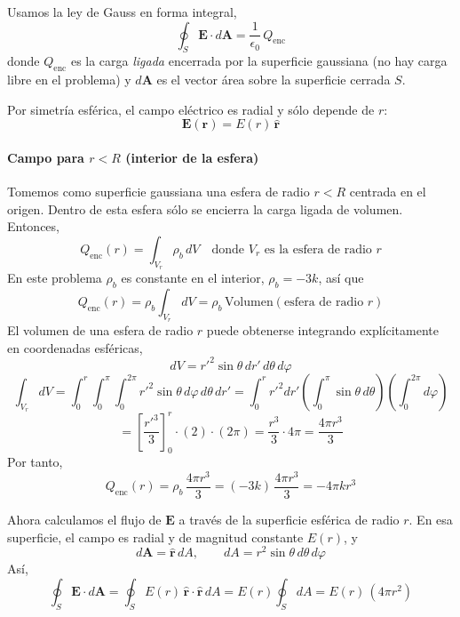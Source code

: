 \documentclass{article}
\begin{document}
Usamos la ley de Gauss en forma integral,
\begin{equation}
\oint_{S} \mathbf{E}\cdot d\mathbf{A} = \frac{1}{\epsilon_{0}}\,Q_{\text{enc}}
\label{eq:gauss}
\end{equation}
donde $Q_{\text{enc}}$ es la carga \emph{ligada} encerrada por la superficie gaussiana
(no hay carga libre en el problema) y $d\mathbf{A}$ es el vector área sobre la superficie cerrada $S$.

Por simetría esférica, el campo eléctrico es radial y sólo depende de $r$:
\begin{equation}
\mathbf{E}(\mathbf{r}) = E(r)\,\hat{\mathbf{r}}
\label{eq:E-radial}
\end{equation}

\paragraph{Campo para $r < R$ (interior de la esfera)}

Tomemos como superficie gaussiana una esfera de radio $r<R$ centrada en el origen.  
Dentro de esta esfera sólo se encierra la carga ligada de volumen. Entonces,
\begin{equation}
Q_{\text{enc}}(r) = \int_{V_{r}} \rho_{b}\, dV
\quad \text{donde } V_{r} \text{ es la esfera de radio } r
\label{eq:Qenc-def}
\end{equation}
En este problema $\rho_{b}$ es constante en el interior, $\rho_{b} = -3k$, así que
\begin{equation}
Q_{\text{enc}}(r) = \rho_{b}\int_{V_{r}} dV
= \rho_{b}\, \text{Volumen}(\text{esfera de radio } r)
\label{eq:Qenc-rho-const}
\end{equation}
El volumen de una esfera de radio $r$ puede obtenerse integrando explícitamente en coordenadas esféricas,
\[
dV = r'^{2}\sin\theta\,dr'\,d\theta\,d\varphi
\]
\[
\int_{V_{r}} dV
= \int_{0}^{r}\int_{0}^{\pi}\int_{0}^{2\pi}
r'^{2}\sin\theta\,d\varphi\,d\theta\,dr'
= \int_{0}^{r} r'^{2}dr'
\left(\int_{0}^{\pi}\sin\theta\,d\theta\right)
\left(\int_{0}^{2\pi}d\varphi\right)
\]
\[
= \left[\frac{r'^{3}}{3}\right]_{0}^{r} \cdot (2) \cdot (2\pi)
= \frac{r^{3}}{3}\cdot 4\pi
= \frac{4\pi r^{3}}{3}
\]
Por tanto,
\begin{equation}
Q_{\text{enc}}(r)
= \rho_{b}\,\frac{4\pi r^{3}}{3}
= (-3k)\,\frac{4\pi r^{3}}{3}
= -4\pi k r^{3}
\label{eq:Qenc-r-menor-R}
\end{equation}

Ahora calculamos el flujo de $\mathbf{E}$ a través de la superficie esférica de radio $r$.  
En esa superficie, el campo es radial y de magnitud constante $E(r)$, y
\[
d\mathbf{A} = \hat{\mathbf{r}}\,dA, 
\qquad dA = r^{2}\sin\theta\,d\theta\,d\varphi
\]
Así,
\begin{equation}
\oint_{S} \mathbf{E}\cdot d\mathbf{A}
= \oint_{S} E(r)\,\hat{\mathbf{r}}\cdot\hat{\mathbf{r}}\,dA
= E(r)\oint_{S} dA
= E(r)\,(4\pi r^{2})
\label{eq:flujo-r-menor-R}
\end{equation}
\end{document}
